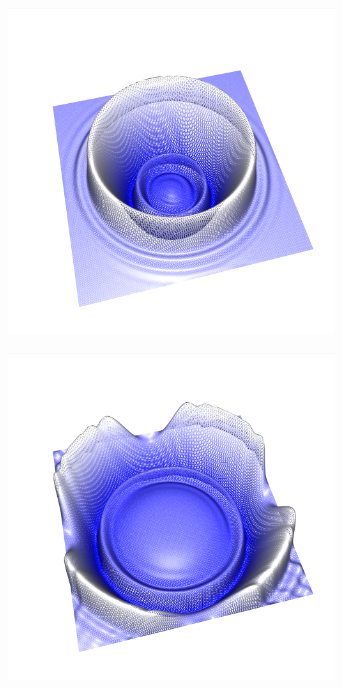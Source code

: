 \documentclass[crop=false,10pt,ngerman]{standalone}
\begin{document}
\begin{figure}[h]
\begin{subfigure}[b]{0.24\textwidth}
          \caption{}
        \end{subfigure}
        \begin{subfigure}[b]{0.24\textwidth}
          \center
          \includegraphics[trim={2cm 1.5cm 1.2cm 1.0cm},clip,width=0.95\textwidth]{images/quad_wave_2.png}
          \caption{}
        \end{subfigure}
        \begin{subfigure}[b]{0.24\textwidth}
          \center
          \includegraphics[trim={2cm 1.5cm 1.2cm 1.0cm},clip,width=0.95\textwidth]{images/quad_wave_3.png}
          \caption{}
        \end{subfigure}


\end{figure}
\end{document}
